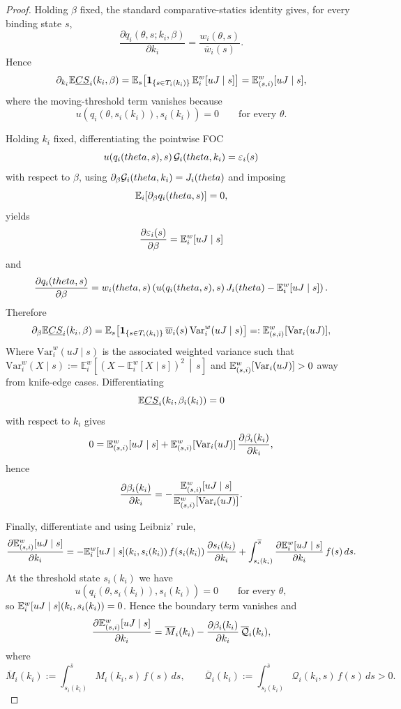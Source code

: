 \documentclass[master.tex]{subfiles}
\begin{document}
\begin{proof}
Holding $\beta$ fixed, the standard comparative-statics identity gives, for every binding state $s$,
\[
\frac{\partial q_i(\theta,s;k_i,\beta)}{\partial k_i}
=
\frac{w_i(\theta,s)}{\overline w_i(s)}.
\]
Hence
\[
\partial_{k_i}\mathbb{E} \underline{CS}_i(k_i,\beta)
=
\mathbb{E}_s\!\left[
\mathbf 1_{\{s\in T_i(k_i)\}}
\,
\mathbb{E}_i^w[uJ\mid s]
\right]
=
\mathbb{E}_{(s,i)}^w[uJ\mid s],
\]
where the moving-threshold term vanishes because
\[
u\!\left(q_i(\theta,s_i(k_i)),s_i(k_i)\right)=0
\qquad
\text{for every }\theta.
\]

Holding $k_i$ fixed, differentiating the pointwise FOC
\[
u\!\left(q_i(theta,s),s\right)\mathcal{G}_i(theta,k_i)
=
\varepsilon_i(s)
\]
with respect to $\beta$, using $\partial_\beta\mathcal{G}_i(theta,k_i)=J_i(theta)$ and imposing
\[
\mathbb{E}_i\!\left[\partial_\beta q_i(theta,s)\right]=0,
\]
yields
\[
\frac{\partial \varepsilon_i(s)}{\partial \beta}
=
\mathbb{E}_i^w[uJ\mid s]
\]
and
\[
\frac{\partial q_i(theta,s)}{\partial \beta}
=
w_i(theta,s)
\left(
u\!\left(q_i(theta,s),s\right)J_i(theta)
-
\mathsf {\mathbb{E}}_i^w[uJ\mid s]
\right).
\]
Therefore
\[
\partial_\beta \mathbb{E} \underline{CS}_i(k_i,\beta)
=
\mathbb{E}_s\!\left[
\mathbf 1_{\{s\in T_i(k_i)\}}
\,
\overline w_i(s)\,
\mathrm{Var}_i^w(uJ\mid s)
\right]
=:
\mathbb{E}_{(s,i)}^w[\mathrm{Var}_i(uJ)],
\]
Where $\mathrm{Var}_i^w(uJ\mid s)$ is the associated weighted variance such that $\mathrm{Var}_i^w(X\mid s)
:=
\mathbb E_i^w\!\left[
\left(X-\mathbb E_i^w[X\mid s]\right)^2
\,\middle|\, s
\right]$ and $\mathbb{E}_{(s,i)}^w[\mathrm{Var}_i(uJ)]>0$ away from knife-edge cases. Differentiating
\[
\mathbb{E} \underline{CS}_i\!\left(k_i,\beta_i(k_i)\right)=0
\]
with respect to $k_i$ gives
\[
0
=
\mathbb{E}_{(s,i)}^w[uJ\mid s]+\mathbb{E}_{(s,i)}^w[\mathrm{Var}_i(uJ)]\,\frac{\partial \beta_i(k_i)}{\partial k_i},
\]
hence
\[
\frac{\partial \beta_i(k_i)}{\partial k_i}
=
-\frac{\mathbb{E}_{(s,i)}^w[uJ\mid s]}{\mathbb{E}_{(s,i)}^w[\mathrm{Var}_i(uJ)]}.
\]

Finally, differentiate and using Leibniz' rule,
\[
\frac{\partial \mathbb{E}_{(s,i)}^w[uJ\mid s]}{\partial k_i}
=
-
\mathbb{E}_i^w[uJ\mid s]\!\left(k_i,s_i(k_i)\right)
f\!\left(s_i(k_i)\right)
\frac{\partial s_i(k_i)}{\partial k_i}
+
\int_{s_i(k_i)}^{\overline s}
\frac{\partial \mathbb{E}_i^w[uJ\mid s]}{\partial k_i}\,f(s)\,ds.
\]
At the threshold state $s_i(k_i)$ we have
\[
u\!\left(q_i(\theta,s_i(k_i)),s_i(k_i)\right)=0
\qquad
\text{for every }\theta,
\]
so $\mathbb{E}_i^w[uJ\mid s]\!\left(k_i,s_i(k_i)\right)=0$. Hence the boundary term vanishes and
\[
\frac{\partial \mathbb{E}_{(s,i)}^w[uJ\mid s]}{\partial k_i}
=
\overline M_i(k_i)-\frac{\partial \beta_i(k_i)}{\partial k_i}\,\overline{\mathcal Q}_i(k_i),
\]
where
\[
\overline M_i(k_i)
:=
\int_{s_i(k_i)}^{\overline s}M_i(k_i,s)\,f(s)\,ds,
\qquad
\overline{\mathcal Q}_i(k_i)
:=
\int_{s_i(k_i)}^{\overline s}\mathcal Q_i(k_i,s)\,f(s)\,ds
>0.
\]


\end{proof}
\end{document}

